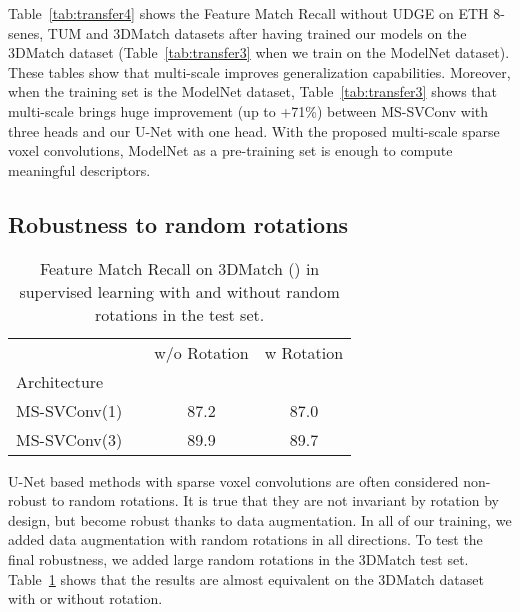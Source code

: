 \documentclass[10pt,twocolumn,letterpaper]{article}
\begin{document}
Table~\ref{tab:transfer4} shows the Feature Match Recall without UDGE on ETH 8-senes, TUM and 3DMatch datasets after having trained our models on the 3DMatch dataset (Table~\ref{tab:transfer3} when we train on the ModelNet dataset). These tables show that multi-scale improves generalization capabilities. Moreover, when the training set is the ModelNet dataset, Table~\ref{tab:transfer3} shows that multi-scale brings huge improvement (up to +71\%) between MS-SVConv with three heads and our U-Net with one head. With the proposed multi-scale sparse voxel convolutions, ModelNet as a pre-training set is enough to compute meaningful descriptors.

\subsection{Robustness to random rotations}

\begin{table}[ht]
\small
\centering
\begin{tabular}[t]{lrcc}
\toprule
&  & w/o Rotation & w Rotation  \\
Architecture & &  &  \\
\midrule
MS-SVConv(1) & & 87.2 & 87.0  \\
MS-SVConv(3) & & 89.9 & 89.7  \\
\bottomrule
\end{tabular}
\caption{Feature Match Recall on 3DMatch () in supervised learning with and without random rotations in the test set.}
\label{tab:rotated}
\end{table}

U-Net based methods with sparse voxel convolutions are often considered non-robust to random rotations. It is true that they are not invariant by rotation by design, but become robust thanks to data augmentation. In all of our training, we added data augmentation with random rotations in all directions. To test the final robustness, we added large random rotations in the 3DMatch test set. Table~\ref{tab:rotated} shows that the results are almost equivalent on the 3DMatch dataset with or without rotation.
\end{document}
